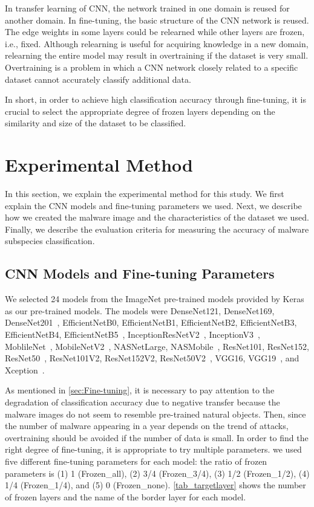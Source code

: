 \documentclass[conference]{IEEEtran}
\begin{document}
In transfer learning of CNN, the network trained in one domain is reused for another domain.
In fine-tuning, the basic structure of the CNN network is reused. The edge weights in some layers could be relearned while other layers are frozen, i.e., fixed.
Although relearning is useful for acquiring knowledge in a new domain, relearning the entire model may result in overtraining if the dataset is very small. Overtraining is a problem in which a CNN network closely related to a specific dataset cannot accurately classify additional data.

In short, in order to achieve high classification accuracy through fine-tuning, it is crucial to select the appropriate degree of frozen layers depending on the similarity and size of the dataset to be classified.

\section{Experimental Method}
\label{sec:method}

In this section, we explain the experimental method for this study.
We first explain the CNN models and fine-tuning parameters we used.
Next, we describe how we created the malware image and the characteristics of the dataset we used.
Finally, we describe the evaluation criteria for measuring the accuracy of malware subspecies classification.

\subsection{CNN Models and Fine-tuning Parameters}

We selected 24 models from the ImageNet pre-trained models provided by Keras as our pre-trained models. The models were DenseNet121, DenseNet169, DenseNet201~\cite{Huang_2017_CVPR}, EfficientNetB0, EfficientNetB1, EfficientNetB2, EfficientNetB3, EfficientNetB4, EfficientNetB5~\cite{pmlr-v97-tan19a}, InceptionResNetV2~\cite{AAAI1714806}, InceptionV3~\cite{7780677}, MoblileNet~\cite{howard2017mobilenets}, MobileNetV2~\cite{8578572}, NASNetLarge, NASMobile~\cite{Zoph_2018_CVPR}, ResNet101, ResNet152, ResNet50~\cite{He_2016_CVPR}, ResNet101V2, ResNet152V2, ResNet50V2~\cite{10.1007/978-3-319-46493-0_38}, VGG16, VGG19~\cite{simonyan2014very}, and Xception~\cite{Chollet_2017_CVPR}.

As mentioned in \autoref{sec:Fine-tuning}, it is necessary to pay attention to the degradation of classification accuracy due to negative transfer because the malware images do not seem to resemble pre-trained natural objects. 
Then, since the number of malware appearing in a year depends on the trend of attacks, overtraining should be avoided if the number of data is small.
In order to find the right degree of fine-tuning, it is appropriate to try multiple parameters. we used five different fine-tuning parameters for each model: the ratio of frozen parameters is (1) 1 (Frozen\_all), (2) 3/4 (Frozen\_3/4), (3) 1/2 (Frozen\_1/2), (4) 1/4 (Frozen\_1/4), and (5) 0 (Frozen\_none).
\autoref{tab_targetlayer} shows the number of frozen layers and the name of the border layer for each model.
\end{document}
